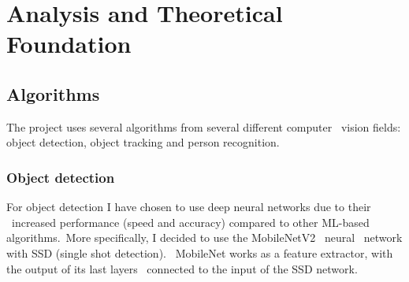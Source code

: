 
\chapter{Analysis and Theoretical Foundation}
\label{ch:analysis}

%
%
%

\section{Algorithms}
\label{sec:analysis-algorithms}
 The project uses several algorithms from several different computer \
vision fields: object detection, object tracking and person recognition.

\subsection{Object detection}
\label{subsec:analysis-object-detection}
For object detection I have chosen to use deep neural networks due to their \
increased performance (speed and accuracy) compared to other ML-based algorithms.\
More specifically, I decided to use the  MobileNetV2~\cite{mobilenet} neural \
network with SSD (single shot detection). \
MobileNet works as a feature extractor, with the output of its last layers \
connected to the input of the SSD network.




